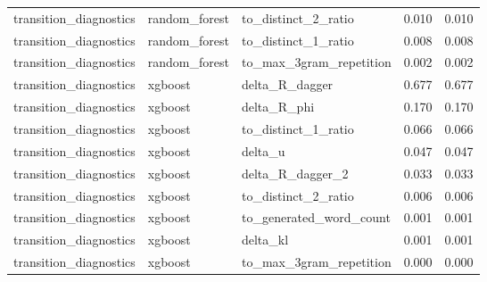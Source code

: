 \begin{tabular}{lllrr}
transition_diagnostics & random_forest & to_distinct_2_ratio & 0.010 & 0.010 \\
transition_diagnostics & random_forest & to_distinct_1_ratio & 0.008 & 0.008 \\
transition_diagnostics & random_forest & to_max_3gram_repetition & 0.002 & 0.002 \\
transition_diagnostics & xgboost & delta_R_dagger & 0.677 & 0.677 \\
transition_diagnostics & xgboost & delta_R_phi & 0.170 & 0.170 \\
transition_diagnostics & xgboost & to_distinct_1_ratio & 0.066 & 0.066 \\
transition_diagnostics & xgboost & delta_u & 0.047 & 0.047 \\
transition_diagnostics & xgboost & delta_R_dagger_2 & 0.033 & 0.033 \\
transition_diagnostics & xgboost & to_distinct_2_ratio & 0.006 & 0.006 \\
transition_diagnostics & xgboost & to_generated_word_count & 0.001 & 0.001 \\
transition_diagnostics & xgboost & delta_kl & 0.001 & 0.001 \\
transition_diagnostics & xgboost & to_max_3gram_repetition & 0.000 & 0.000 \\
\bottomrule
\end{tabular}
